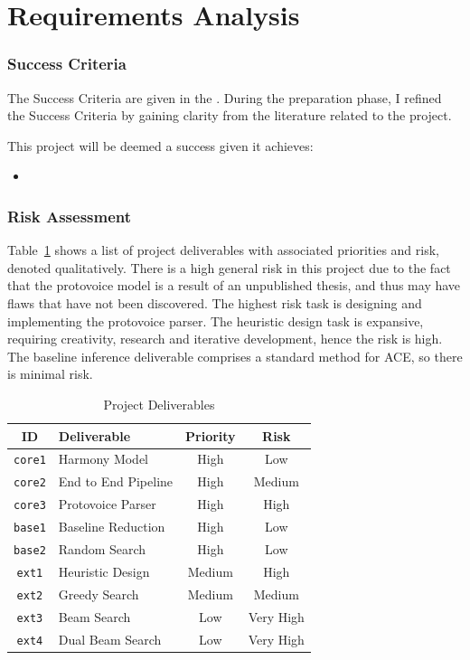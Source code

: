 \documentclass[12pt,a4paper,twoside,openright]{report}
\theoremstyle{definition}
\begin{document}
\section{Requirements Analysis}
\subsubsection{Success Criteria}
The Success Criteria are given in the . During the preparation phase, I refined the Success Criteria by gaining clarity from the literature related to the project. 

This project will be deemed a success given it achieves:
\begin{itemize}
  \item 
\end{itemize}

\subsubsection{Risk Assessment}

Table~\ref{tab:deliverables} shows a list of project deliverables with associated priorities and risk, denoted qualitatively. There is a high general risk in this project due to the fact that the protovoice model is a result of an unpublished thesis, and thus may have flaws that have not been discovered. The highest risk task is designing and implementing the protovoice parser. The heuristic design task is expansive, requiring creativity, research and iterative development, hence the risk is high. The baseline inference deliverable comprises a standard method for ACE, so there is minimal risk.

\begin{table}[h]
  \caption{Project Deliverables}
  \vspace{\baselineskip}
  \label{tab:deliverables}
  \centering
  \begin{tabularx}{0.9\textwidth}{cXcc}
    {\large \textbf{ID}} & \large \textbf{Deliverable} & \large \textbf{Priority} & \large \textbf{Risk} \\
    \toprule
    \texttt{core1} & Harmony Model & High & Low \\
    \texttt{core2} & End to End Pipeline  & High & Medium \\
    \texttt{core3} & Protovoice Parser & High & High \\
    \texttt{base1} & Baseline Reduction & High & Low \\
    \texttt{base2} & Random Search & High & Low \\
    \texttt{ext1} & Heuristic Design & Medium & High \\
    \texttt{ext2} & Greedy Search & Medium & Medium \\
    \texttt{ext3} & Beam Search & Low & Very High \\
    \texttt{ext4} & Dual Beam Search & Low & Very High \\
  \end{tabularx}
\end{table}
\end{document}
